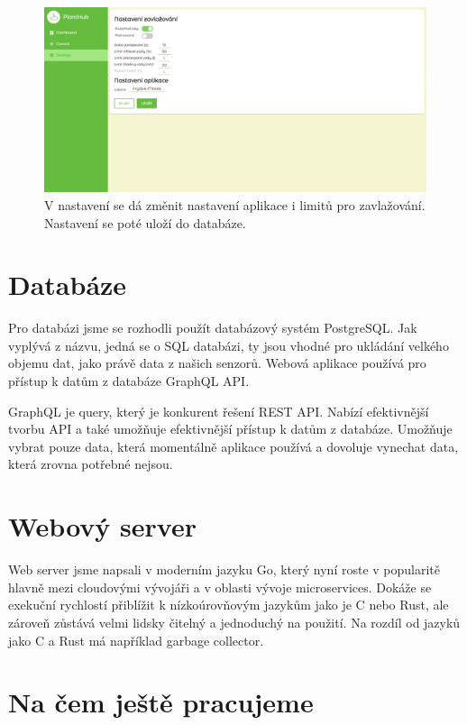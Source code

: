 \documentclass[11pt,a4paper]{article}
\begin{document}
\begin{figure}[h]
	\centering
	\includegraphics[width=0.9\linewidth]{web-ui-settings.png}
	\caption{V nastavení se dá změnit nastavení aplikace i limitů pro
		zavlažování. Nastavení se poté uloží do databáze.}
\end{figure}

\clearpage

\section{Databáze}

Pro databázi jsme se rozhodli použít databázový systém PostgreSQL. Jak vyplývá
z názvu, jedná se o SQL databázi, ty jsou vhodné pro ukládání velkého objemu
dat, jako právě data z našich senzorů. Webová aplikace používá pro přístup k
datům z databáze GraphQL API.

GraphQL je query, který je konkurent řešení REST API. Nabízí efektivnější
tvorbu API a také umožňuje efektivnější přístup k datům z databáze. Umožňuje
vybrat pouze data, která momentálně aplikace používá a dovoluje vynechat data,
která zrovna potřebné nejsou.

\clearpage

\section{Webový server}

Web server jsme napsali v moderním jazyku Go, který nyní roste v popularitě
hlavně mezi cloudovými vývojáři a v oblasti vývoje microservices. Dokáže se
exekuční rychlostí přiblížit k nízkoúrovňovým jazykům jako je C nebo Rust, ale
zároveň zůstává velmi lidsky čitelný a jednoduchý na použití. Na rozdíl od
jazyků jako C a Rust má například garbage collector.

\clearpage

\section{Na čem ještě pracujeme}
\end{document}
